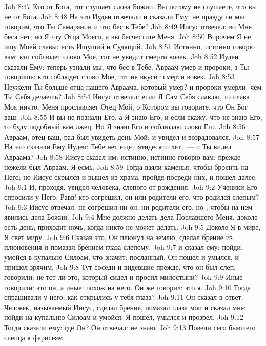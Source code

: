 \vs Joh 8:47 Кто от Бога, тот слушает слова Божии. Вы потому не слушаете, что вы не от Бога.
\vs Joh 8:48 На это Иудеи отвечали и сказали Ему: не правду ли мы говорим, что Ты Самарянин и что бес в Тебе?
\vs Joh 8:49 Иисус отвечал: во Мне беса нет; но Я чту Отца Моего, а вы бесчестите Меня.
\vs Joh 8:50 Впрочем Я не ищу Моей славы: есть Ищущий и Судящий.
\vs Joh 8:51 Истинно, истинно говорю вам: кто соблюдет слово Мое, тот не увидит смерти вовек.
\vs Joh 8:52 Иудеи сказали Ему: теперь узнали мы, что бес в Тебе. Авраам умер и пророки, а Ты говоришь: кто соблюдет слово Мое, тот не вкусит смерти вовек.
\vs Joh 8:53 Неужели Ты больше отца нашего Авраама, который умер? и пророки умерли: чем Ты Себя делаешь?
\vs Joh 8:54 Иисус отвечал: если Я Сам Себя славлю, то слава Моя ничто. Меня прославляет Отец Мой, о Котором вы говорите, что Он Бог ваш.
\vs Joh 8:55 И вы не познали Его, а Я знаю Его; и если скажу, что не знаю Его, то буду подобный вам лжец. Но Я знаю Его и соблюдаю слово Его.
\vs Joh 8:56 Авраам, отец ваш, рад был увидеть день Мой; и увидел и возрадовался.
\vs Joh 8:57 На это сказали Ему Иудеи: Тебе нет еще пятидесяти лет,~--- и Ты видел Авраама?
\vs Joh 8:58 Иисус сказал им: истинно, истинно говорю вам: прежде нежели был Авраам, Я есмь.
\vs Joh 8:59 Тогда взяли каменья, чтобы бросить на Него; но Иисус скрылся и вышел из храма, пройдя посреди них, и пошел далее.
\vs Joh 9:1 И, проходя, увидел человека, слепого от рождения.
\vs Joh 9:2 Ученики Его спросили у Него: Равв! кто согрешил, он или родители его, что родился слепым?
\vs Joh 9:3 Иисус отвечал: не согрешил ни он, ни родители его, но , чтобы на нем явились дела Божии.
\vs Joh 9:4 Мне должно делать дела Пославшего Меня, доколе есть день; приходит ночь, когда никто не может делать.
\vs Joh 9:5 Доколе Я в мире, Я свет миру.
\vs Joh 9:6 Сказав это, Он плюнул на землю, сделал брение из плюновения и помазал брением глаза слепому,
\vs Joh 9:7 и сказал ему: пойди, умойся в купальне Силоам, что значит: посланный. Он пошел и умылся, и пришел зрячим.
\vs Joh 9:8 Тут соседи и видевшие прежде, что он был слеп, говорили: не тот ли это, который сидел и просил милостыни?
\vs Joh 9:9 Иные говорили: это он, а иные: похож на него. Он же говорил: это я.
\vs Joh 9:10 Тогда спрашивали у него: как открылись у тебя глаза?
\vs Joh 9:11 Он сказал в ответ: Человек, называемый Иисус, сделал брение, помазал глаза мои и сказал мне: пойди на купальню Силоам и умойся. Я пошел, умылся и прозрел.
\vs Joh 9:12 Тогда сказали ему: где Он? Он отвечал: не знаю.
\vs Joh 9:13 Повели сего бывшего слепца к фарисеям.
